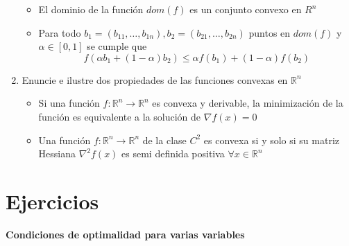 \documentclass[12pt]{article}
\begin{document}
\begin{enumerate}
    \begin{itemize}
        \item El dominio de la función $dom (f)$ es un conjunto convexo en $R^n$
        \item Para todo $b_1 = (b_{11}, \dots, b_{1n}), b_2 = (b_{21},\dots,b_{2n})$ puntos en $dom(f)$ y $\alpha \in [0,1]$ se cumple que
        \[f(\alpha b_1 + (1-\alpha)b_2) \leq \alpha f(b_1)+(1-\alpha)f(b_2)\]
    \end{itemize}
    \item Enuncie e ilustre dos propiedades de las funciones convexas en $\mathbb{R}^n$
    \begin{itemize}
        \item Si una función $f:\mathbb{R}^n \rightarrow \mathbb{R}^n$ es convexa y derivable, la minimización de la función es equivalente a la solución de $\nabla f(x) =0$
        \item Una función  $f:\mathbb{R}^n \rightarrow \mathbb{R}^n$ de la clase $C^2$ es convexa si y solo si su matriz Hessiana $\nabla^2f(x)$ es semi definida positiva $\forall x \in \mathbb{R}^n$  
    \end{itemize}
\end{enumerate}

\newpage

\section*{Ejercicios}

\textbf{Condiciones de optimalidad para varias variables}
\end{document}
